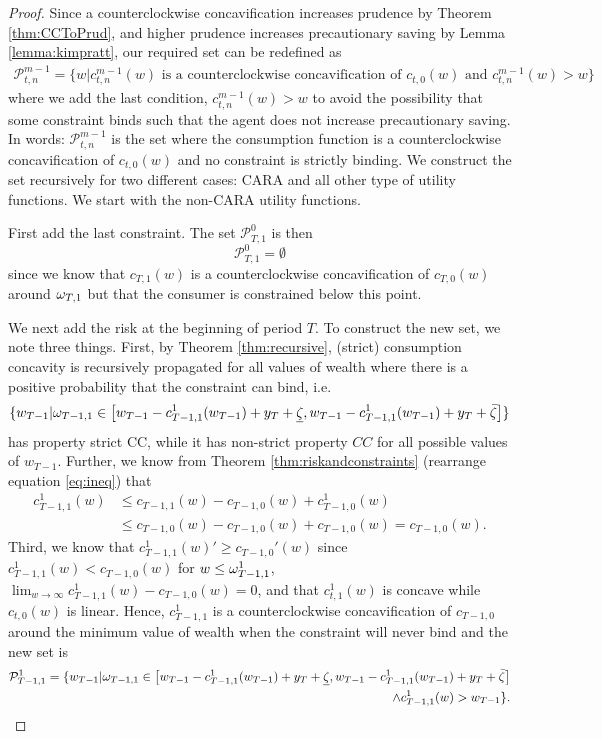 \begin{proof}
	Since a counterclockwise concavification increases prudence by Theorem \ref{thm:CCToPrud}, and higher prudence increases precautionary saving by Lemma \ref{lemma:kimpratt}, our required set can be redefined as
	\begin{align*} \mathcal{P}_{t,n}^{m-1} = \{w | c_{t,n}^{m-1}(w) \text{ is a counterclockwise concavification of } c_{t,0}(w) \text{ and } c_{t,n}^{m-1}(w) > w
	\}\end{align*}
	where we add the last condition, $c_{t,n}^{m-1}(w) > w$ to avoid the possibility that some constraint binds such that the agent does not increase precautionary saving. In words: $\mathcal{P}_{t,n}^{m-1}$ is the set where the consumption function is a counterclockwise concavification of $c_{t,0}(w)$ and no constraint is strictly binding. We construct the set recursively for two different cases: CARA and all other type of utility functions. We start with the non-CARA utility functions.
	
	First add the last constraint. The set $\mathcal{P}_{T,1}^0$ is then
	\[\mathcal{P}_{T,1}^0 = \emptyset \]%
    since we know that $c_{T,1}(w)$ is a counterclockwise concavification of $c_{T,0}(w)$ around $\omega_{T,1}$ but that the consumer is constrained below this point.
	
	We next add the risk at the beginning of period $T$. To construct the new set, we note three things. First, by Theorem \ref{thm:recursive},  (strict) consumption concavity is recursively propagated for all values of wealth where there is a positive probability that the constraint can bind, i.e.
		\[\{w_{T-1} | \omega_{T-1,1} \in \left[w_{T-1} - c_{T-1,1}^1(w_{T-1}) + {y}_{T} + \underline{\zeta} ,w_{T-1} - c_{T-1,1}^1(w_{T-1}) + {y}_{T} + \bar{\zeta}\right] \}\]
	has property strict CC, while it has non-strict property $CC$ for all possible values of $w_{T-1}$. Further, we know from Theorem \ref{thm:riskandconstraints} (rearrange equation \eqref{eq:ineq}) that
	\begin{align*}{c}_{T-1,1}^1(w)  & \leq c_{T-1,1}(w) - c_{T-1,0}(w) + {c}_{T-1,0}^1(w) \\ &\leq c_{T-1,0}(w) - c_{T-1,0}(w) + c_{T-1,0}(w) = c_{T-1,0}(w).\end{align*}
	Third, we know that $c_{T-1,1}^{1}(w)' \geq c_{T-1,0}'(w)$ since ${c}_{T-1,1}^1(w) < c_{T-1,0}(w)$ for $w \leq \omega_{T-1,1}^1$, $\lim_{w\rightarrow \infty} c_{T-1,1}^1(w) - c_{T-1,0}(w) = 0$, and that $c_{t,1}^1(w)$ is concave while $c_{t,0}(w)$ is linear. Hence, $c_{T-1,1}^1$ is a counterclockwise concavification of $c_{T-1,0}$ around the minimum value of wealth when the constraint will never bind and the new set is
	\begin{align*}\mathcal{P}_{T-1,1}^1 = \{w_{T-1} | \omega_{T-1,1} \in \left[w_{T-1} - c_{T-1,1}^1(w_{T-1}) + {y}_{T} + \underline{\zeta}, w_{T-1} - c_{T-1,1}^1(w_{T-1}) + {y}_{T} + \bar{\zeta}\right]   \\ \wedge c_{T-1,1}^1(w) > w_{T-1}\}.\end{align*}
	

\end{proof}

